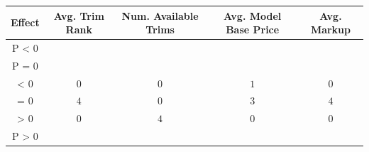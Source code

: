 \begin{tabular}{ccccc}
\toprule
Effect & Avg. Trim Rank & Num. Available Trims & Avg. Model Base Price & Avg. Markup \\
\midrule
P \textless{} 0 \\
\midrule
\midrule
P = 0 \\
\midrule
\textless{} 0 & $0$ & $0$ & $1$ & $0$ \\
= 0 & $4$ & $0$ & $3$ & $4$ \\
\textgreater{} 0 & $0$ & $4$ & $0$ & $0$ \\
\midrule
P \textgreater{} 0 \\
\midrule
\bottomrule
\end{tabular}
